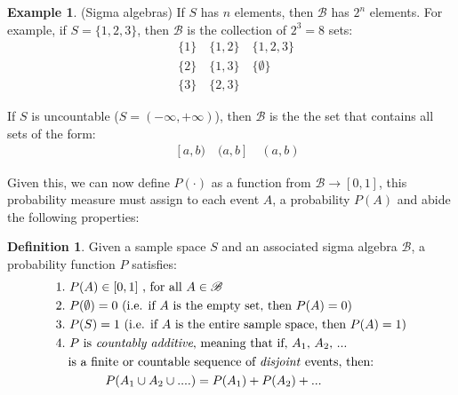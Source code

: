 \documentclass[
  oneside,
  11pt, a4paper,
  footinclude=true,
  headinclude=true,
  cleardoublepage=empty
]{scrbook}
\theoremstyle{definition}
\newtheorem{definition}{Definition}[section]
\theoremstyle{definition}
\newtheorem{example}{Example}[definition]
\begin{document}
                \begin{example}{(Sigma algebras)}
                    If $S$ has $n$ elements, then $\mathscr{B}$ has $2^n$ elements. For example, if $S = \{1,2,3\}$, then $\mathscr{B}$ is the collection of $2^3 = 8$ sets:
                    \begin{align*}
                        &\{1\}\quad \{1,2\}\quad \{1,2,3\} \\
                        &\{2\}\quad \{1,3\}\quad \{\emptyset\} \\
                        &\{3\}\quad \{2,3\}
                    \end{align*}{}
                    
                    If $S$ is uncountable ($S = (-\infty, +\infty)$), then $\mathscr{B}$ is the the set that contains all sets of the form:
                    \begin{align*}
                       [a, b]\quad [a, b)\quad (a, b]\quad (a, b) 
                    \end{align*}{}
                \end{example}{}
                
                Given this, we can now define $P(\cdot)$ as a function from $\mathscr{B} \rightarrow [0,1]$, this probability measure must assign to each event $A$, a probability $P(A)$ and abide the following properties:
                
                \begin{definition}{Given a sample space $S$ and an associated sigma algebra $\mathscr{B}$, a probability function $P$ satisfies:}
                \begin{align*}
                & 1.\ P(A) \in [0, 1]\ \text{, for all}\ A \in \mathscr{B} \\
                & 2.\ P(\emptyset) = 0\ \text{(i.e. if $A$ is the empty set, then $P(A) = 0$)} \\
                & 3.\ P(S) = 1\ \text{(i.e. if $A$ is the entire sample space, then $P(A) = 1$)} \\
                & 4.\ \text{$P$ is \emph{countably additive}, meaning that if, $A_1$, $A_2$, ...} \\ 
                & \quad \text{is a finite or countable sequence of \emph{disjoint} events, then:}\\
                & \qquad\qquad P(A_1 \cup A_2 \cup ....) = P(A_1) + P(A_2) + \text{...} 
                \end{align*}{}
                \end{definition}{}
                
\end{document}
